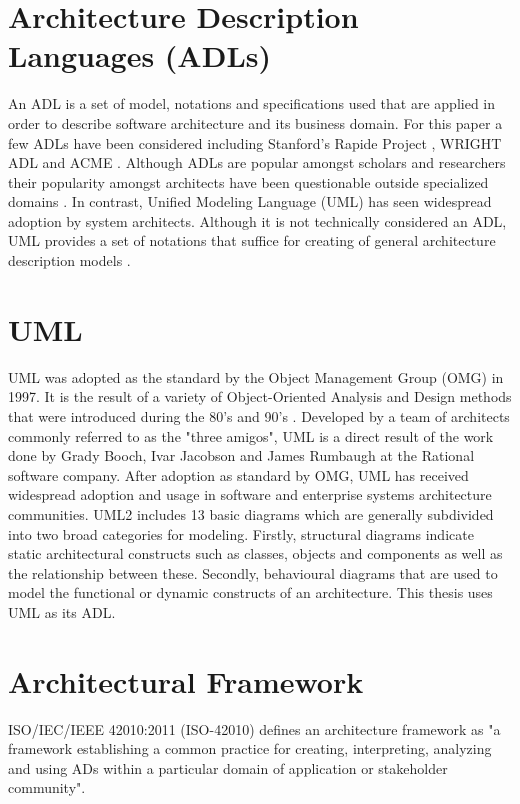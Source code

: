 \section{Architecture Description Languages (ADLs)}

An ADL is a set of model, notations and specifications used that are applied in order to describe software architecture and its business domain. For this paper a few ADLs have been considered including Stanford's Rapide Project \cite{Luckham1996}, WRIGHT ADL \cite{Allen1997} and ACME \cite{bjorn}. Although ADLs are popular amongst scholars and researchers their popularity amongst architects have been questionable outside specialized domains \cite{Woods2005}. In contrast, Unified Modeling Language (UML) has seen widespread adoption by system architects. Although it is not technically considered an ADL, UML provides a set of notations that suffice for creating of general architecture description models \cite{Woods2005}.

\section{UML}

UML was adopted as the standard by the Object Management Group (OMG) in 1997. It is the result of a variety of Object-Oriented Analysis and Design methods that were introduced during the 80's and 90's \cite{Fowler2004}. Developed by a team of architects commonly referred to as the "three amigos", UML is a direct result of the work done by Grady Booch, Ivar Jacobson and James Rumbaugh at the Rational software company. After adoption as standard by OMG, UML has received widespread adoption and usage in software and enterprise systems architecture communities. UML2 includes 13 basic diagrams which are generally subdivided into two broad categories for modeling. Firstly, structural diagrams indicate static architectural constructs such as classes, objects and components as well as the relationship between these. Secondly, behavioural diagrams that are used to model the functional or dynamic constructs of an architecture. This thesis uses UML as its ADL.


\section{Architectural Framework}

ISO/IEC/IEEE 42010:2011 (ISO-42010) defines an architecture framework as "a framework establishing a common practice for creating, interpreting, analyzing and using ADs within a particular domain of application or stakeholder community".



